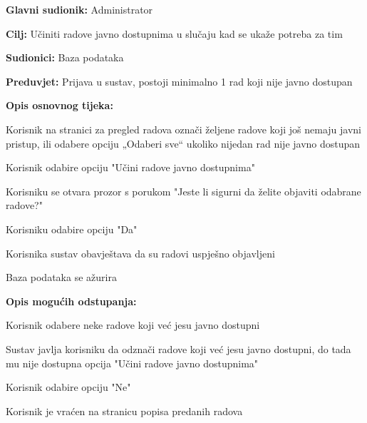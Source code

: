 					\begin{packed_item}
						
						\item \textbf{Glavni sudionik: } Administrator
						\item  \textbf{Cilj:} Učiniti radove javno dostupnima u slučaju kad se ukaže potreba za tim
						\item  \textbf{Sudionici:} Baza podataka
						\item  \textbf{Preduvjet:} Prijava u sustav, postoji minimalno 1 rad koji nije javno dostupan
						\item  \textbf{Opis osnovnog tijeka:}
						
						\item[] \begin{packed_enum}
							
							\item	 Korisnik na stranici za pregled radova označi željene radove koji još nemaju javni pristup, ili odabere opciju „Odaberi sve“ ukoliko nijedan rad nije javno dostupan
							\item Korisnik odabire opciju "Učini radove javno dostupnima"
							\item Korisniku se otvara prozor s porukom "Jeste li sigurni da želite objaviti odabrane radove?"
							\item Korisniku odabire opciju "Da"
							\item Korisnika sustav obavještava da su radovi uspješno objavljeni
							\item Baza podataka se ažurira
							
						\end{packed_enum}
					
						\item \textbf{Opis mogućih odstupanja:}
						\item[] \begin{packed_enum}
							\item[1.a] Korisnik odabere neke radove koji već jesu javno dostupni
							\item[] \begin{packed_enum}
								\item[1.] Sustav javlja korisniku da odznači radove koji već jesu javno dostupni, do tada mu nije dostupna opcija "Učini radove javno dostupnima"
							\end{packed_enum}
							\item[4.a] Korisnik odabire opciju "Ne"
							\item[] \begin{packed_enum}
								\item[1.] Korisnik je vraćen na stranicu popisa predanih radova
							\end{packed_enum} 
						\end{packed_enum}
						
					\end{packed_item}

